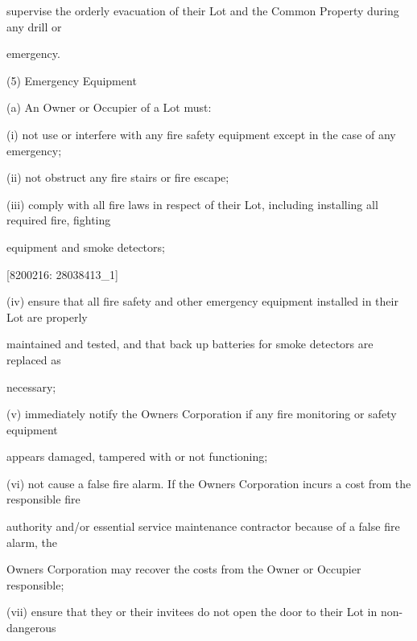 \documentclass{article}
\begin{document}
{\fontsize{10.02}{1}supervise the orderly evacuation of their Lot and the Common Property during any drill or }

{\fontsize{10.02}{1}emergency. }

{\fontsize{9.962}{1}(5) Emergency Equipment }

{\fontsize{9.962}{1}(a) An Owner or Occupier of a Lot must: }

{\fontsize{9.962}{1}(i) not use or interfere with any fire safety equipment except in the case of any emergency; }

{\fontsize{9.962}{1}(ii) not obstruct any fire stairs or fire escape; }

{\fontsize{9.962}{1}(iii) comply with all fire laws in respect of their Lot, including installing all required fire, fighting }

{\fontsize{10.02}{1}equipment and smoke detectors; }

\newpage
















{\fontsize{7.02}{1}[8200216: 28038413\_1] }


{\fontsize{9.962}{1}(iv) ensure that all fire safety and other emergency equipment installed in their Lot are properly }

{\fontsize{10.02}{1}maintained and tested, and that back up batteries for smoke detectors are replaced as }

{\fontsize{10.02}{1}necessary; }

{\fontsize{9.962}{1}(v) immediately notify the Owners Corporation if any fire monitoring or safety equipment }

{\fontsize{10.02}{1}appears damaged, tampered with or not functioning; }

{\fontsize{9.962}{1}(vi) not cause a false fire alarm. If the Owners Corporation incurs a cost from the responsible fire }

{\fontsize{10.02}{1}authority and/or essential service maintenance contractor because of a false fire alarm, the }

{\fontsize{10.02}{1}Owners Corporation may recover the costs from the Owner or Occupier responsible; }

{\fontsize{9.962}{1}(vii) ensure that they or their invitees do not open the door to their Lot in non-dangerous }
\end{document}

